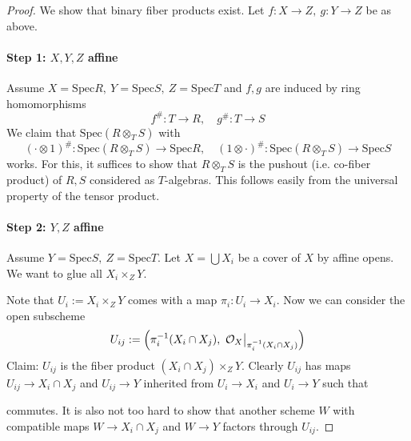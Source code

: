 \documentclass{scrartcl}
\newcommand{\Spec}{\mathrm{Spec}}
\renewcommand{\O}{\mathcal{O}}
\newcommand\restr[2]{{
    \left.\kern-\nulldelimiterspace
    #1
    \vphantom{\big|}
    \right|_{#2}
}}
\theoremstyle{definition}
\begin{document}
\begin{proof}
    We show that binary fiber products exist.
    Let $f: X \to Z, \ g: Y \to Z$ be as above.

    \paragraph{Step 1: $X, Y, Z$ affine} Assume $X = \Spec R, \ Y = \Spec S, \ Z = \Spec T$ and $f, g$ are induced by ring homomorphisms
    \begin{equation*}
        f^\#: T \to R, \quad g^\#: T \to S
    \end{equation*}
    We claim that $\Spec(R \otimes_T S)$ with 
    \begin{equation*}
        (\cdot \otimes 1)^\#: \Spec(R \otimes_T S) \to \Spec R, \quad (1 \otimes \cdot)^\#: \Spec(R \otimes_T S) \to \Spec S
    \end{equation*}
    works.
    For this, it suffices to show that $R \otimes_T S$ is the pushout (i.e. co-fiber product) of $R, S$ considered as $T$-algebras.
    This follows easily from the universal property of the tensor product.
    \paragraph{Step 2: $Y, Z$ affine} Assume $Y = \Spec S, \ Z = \Spec T$.
    Let $X = \bigcup X_i$ be a cover of $X$ by affine opens.
    We want to glue all $X_i \times_Z Y$.

    Note that $U_i := X_i \times_Z Y$ comes with a map $\pi_i: U_i \to X_i$.
    Now we can consider the open subscheme
    \begin{equation*}
        U_{ij} := \Bigl( \pi_i^{-1}(X_i \cap X_j), \ \restr{\O_{X}}{\pi_i^{-1}(X_i \cap X_j)} \Bigr)
    \end{equation*}
    Claim: $U_{ij}$ is the fiber product $(X_i \cap X_j) \times_Z Y$.
    Clearly $U_{ij}$ has maps $U_{ij} \to X_i \cap X_j$ and $U_{ij} \to Y$ inherited from $U_i \to X_i$ and $U_i \to Y$ such that
    \begin{center}
    \end{center}
    commutes.
    It is also not too hard to show that another scheme $W$ with compatible maps $W \to X_i \cap X_j$ and $W \to Y$ factors through $U_{ij}$.


\end{proof}
\end{document}
